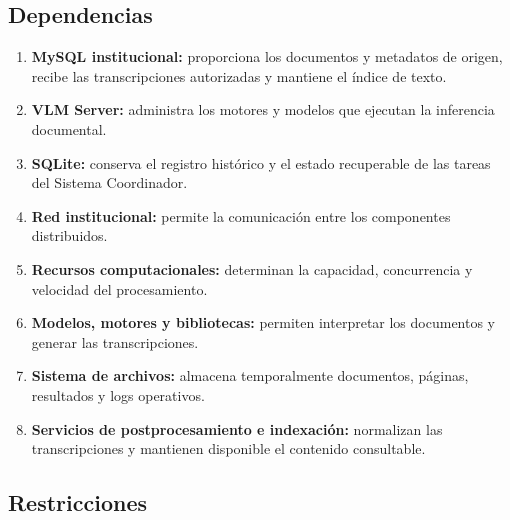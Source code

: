 \subsection{Dependencias}
\label{subsec:dependencias}

\begin{enumerate}
    \item \textbf{MySQL institucional:} proporciona los documentos y metadatos de origen, recibe las transcripciones autorizadas y mantiene el índice de texto.
    \item \textbf{VLM Server:} administra los motores y modelos que ejecutan la inferencia documental.
    \item \textbf{SQLite:} conserva el registro histórico y el estado recuperable de las tareas del Sistema Coordinador.
    \item \textbf{Red institucional:} permite la comunicación entre los componentes distribuidos.
    \item \textbf{Recursos computacionales:} determinan la capacidad, concurrencia y velocidad del procesamiento.
    \item \textbf{Modelos, motores y bibliotecas:} permiten interpretar los documentos y generar las transcripciones.
    \item \textbf{Sistema de archivos:} almacena temporalmente documentos, páginas, resultados y logs operativos.
    \item \textbf{Servicios de postprocesamiento e indexación:} normalizan las transcripciones y mantienen disponible el contenido consultable.
\end{enumerate}

\subsection{Restricciones}
\label{subsec:restricciones}

